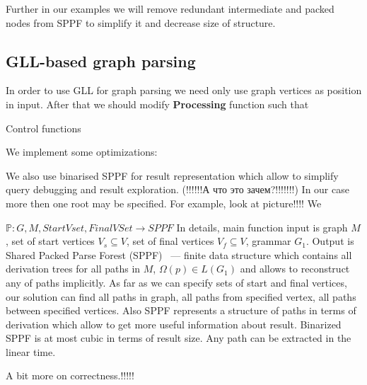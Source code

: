 Further in our examples we will remove redundant intermediate and packed nodes from SPPF to simplify it and decrease size of structure.

\subsection{GLL-based graph parsing}
In order to use GLL for graph parsing we need only use graph vertices as position in input. After that we should modify \textbf{Processing} function such that 

\begin{algorithm}[h]
\begin{algorithmic}[1]
\caption{Control functions}
\label{mainFunctions}
       \Else 
       \EndIf
       \EndIf
  \EndCase
       \EndFor
  \EndCase
  \EndCase
  \Case{$\_$}
  \EndCase
  \EndSwitch
\EndFunction

\end{algorithmic}
\end{algorithm}



We implement some optimizations:~\cite{FastPracticalGLL}

We also use binarised SPPF for result representation which allow to simplify query debugging and result exploration. (!!!!!!А что это  зачем?!!!!!!!)
In our case more then one root may be specified. For example, look at picture!!!! 
We 

$\mathbb{P}:G, M, StartVset, FinalVSet \rightarrow SPPF$
In details, main function input is graph $M$, set of start vertices $V_s\subseteq V$, set of final vertices $V_f\subseteq V$, grammar $G_1$.
Output is Shared Packed Parse Forest (SPPF)~\cite{SPPF} --- finite data structure which contains all derivation trees for all paths in $M$, $\Omega(p) \in L(G_1)$ and allows to reconstruct any of paths implicitly.
As far as we can specify sets of start and final vertices, our solution can find all paths in graph, all paths from specified vertex, all paths between specified vertices. 
Also SPPF represents a structure of paths in terms of derivation which allow to get more useful 
information about result. 
Binarized SPPF is at most cubic in terms of result size. 
Any path can be extracted in the linear time.

A bit more on correctness.!!!!!
